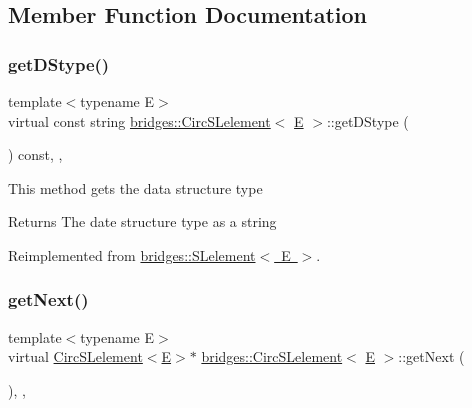\subsection{Member Function Documentation}
\mbox{\label{classbridges_1_1_circ_s_lelement_a4b27c205af46162371e3ffe05cbbe3d5}} 
\subsubsection{\texorpdfstring{getDStype()}{getDStype()}}
{\footnotesize\ttfamily template$<$typename E$>$ \\
virtual const string \mbox{\hyperlink{classbridges_1_1_circ_s_lelement}{bridges\+::\+Circ\+S\+Lelement}}$<$ \mbox{\hyperlink{namespacebridges_acfb0a4f7877d8f63de3e6862004c50eda3a3ea00cfc35332cedf6e5e9a32e94da}{E}} $>$\+::get\+D\+Stype (\begin{DoxyParamCaption}{ }\end{DoxyParamCaption}) const\hspace{0.3cm}{\ttfamily [inline]}, {\ttfamily [override]}, {\ttfamily [virtual]}}

This method gets the data structure type

\begin{DoxyReturn}{Returns}
The date structure type as a string 
\end{DoxyReturn}


Reimplemented from \mbox{\hyperlink{classbridges_1_1_s_lelement_a136330b3481a47b3edb429f323274655}{bridges\+::\+S\+Lelement$<$ E $>$}}.

\mbox{\label{classbridges_1_1_circ_s_lelement_aab863627c125c6f1075af7e7b7f340cf}} 
\subsubsection{\texorpdfstring{getNext()}{getNext()}}
{\footnotesize\ttfamily template$<$typename E$>$ \\
virtual \mbox{\hyperlink{classbridges_1_1_circ_s_lelement}{Circ\+S\+Lelement}}$<$\mbox{\hyperlink{namespacebridges_acfb0a4f7877d8f63de3e6862004c50eda3a3ea00cfc35332cedf6e5e9a32e94da}{E}}$>$$\ast$ \mbox{\hyperlink{classbridges_1_1_circ_s_lelement}{bridges\+::\+Circ\+S\+Lelement}}$<$ \mbox{\hyperlink{namespacebridges_acfb0a4f7877d8f63de3e6862004c50eda3a3ea00cfc35332cedf6e5e9a32e94da}{E}} $>$\+::get\+Next (\begin{DoxyParamCaption}{ }\end{DoxyParamCaption})\hspace{0.3cm}{\ttfamily [inline]}, {\ttfamily [override]}, {\ttfamily [virtual]}}

